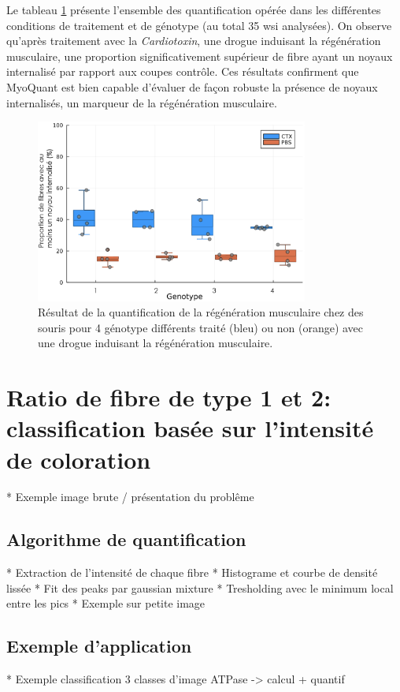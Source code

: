 Le tableau \ref{fig:fluo_compil} présente l'ensemble des quantification opérée dans les différentes conditions de traitement et de génotype (au total 35 \gls{wsi} analysées). On observe qu'après traitement avec la \textit{Cardiotoxin}, une drogue induisant la régénération musculaire, une proportion significativement supérieur de fibre ayant un noyaux internalisé par rapport aux coupes contrôle. Ces résultats confirment que MyoQuant est bien capable d'évaluer de façon robuste la présence de noyaux internalisés, un marqueur de la régénération musculaire.

\begin{figure}[htbp]
 \centering
 \includegraphics[width=0.8\textwidth]{figures/fluo_compil.png}
 \caption[Résultat de la quantification de la régénération musculaire]{Résultat de la quantification de la régénération musculaire chez des souris pour 4 génotype différents traité (bleu) ou non (orange) avec une drogue induisant la régénération musculaire.}
 \label{fig:fluo_compil}
\end{figure}

\section{Ratio de fibre de type 1 et 2: classification basée sur l'intensité de coloration}

* Exemple image brute / présentation du problême
\subsection{Algorithme de quantification}
* Extraction de l'intensité de chaque fibre
* Histograme et courbe de densité lissée
* Fit des peaks par gaussian mixture
* Tresholding avec le minimum local entre les pics
* Exemple sur petite image

\subsection{Exemple d'application}
* Exemple classification 3 classes d'image ATPase -> calcul + quantif

